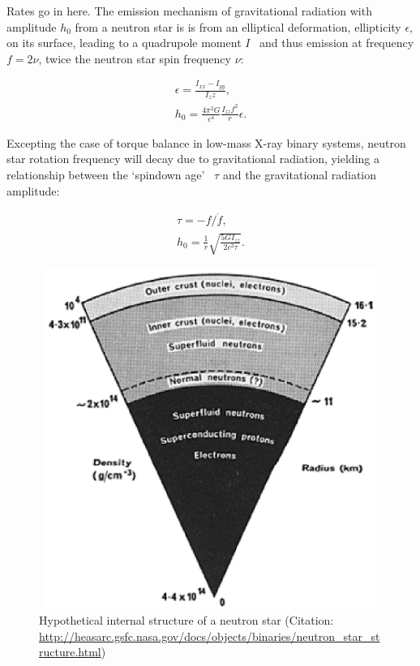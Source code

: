 		Rates go in here.
        The emission mechanism of gravitational radiation with amplitude $h_0$ from a neutron star is is from an elliptical deformation, ellipticity $\epsilon$, on its surface, leading to a quadrupole moment $I$~\cite{Zimmermann1979,LSCPulsar2006} and thus emission at frequency $f = 2\nu$, twice the neutron star spin frequency $\nu$:

        \begin{eqnarray}
        \epsilon = \frac{I_{xx} - I_{yy}}{I_zz}, \\
        h_0 = \frac{4 \pi^2 G}{c^4} \frac{I_{zz} f^2}{r} \epsilon.
        \end{eqnarray}

Excepting the case of torque balance in low-mass X-ray binary systems, neutron star rotation frequency will decay due to gravitational radiation, yielding a relationship between the `spindown age'~\cite{Brady1998} $\tau$ and the gravitational radiation amplitude:

        \begin{eqnarray}
        \tau = -f / \dot{f}, \\
        h_0 = \frac{1}{r} \sqrt{\frac{5 G I_{zz}}{2 c^2 \tau}}.
        \end{eqnarray}

	\begin{figure}
	\begin{center}
	\includegraphics[height=111mm, width=148mm]{neutron_star_structure.eps}
	\caption{Hypothetical internal structure of a neutron star (Citation: \url{http://heasarc.gsfc.nasa.gov/docs/objects/binaries/neutron_star_structure.html})} 
	\label{neutron_star_structure}
	\end{center}
	\end{figure}



